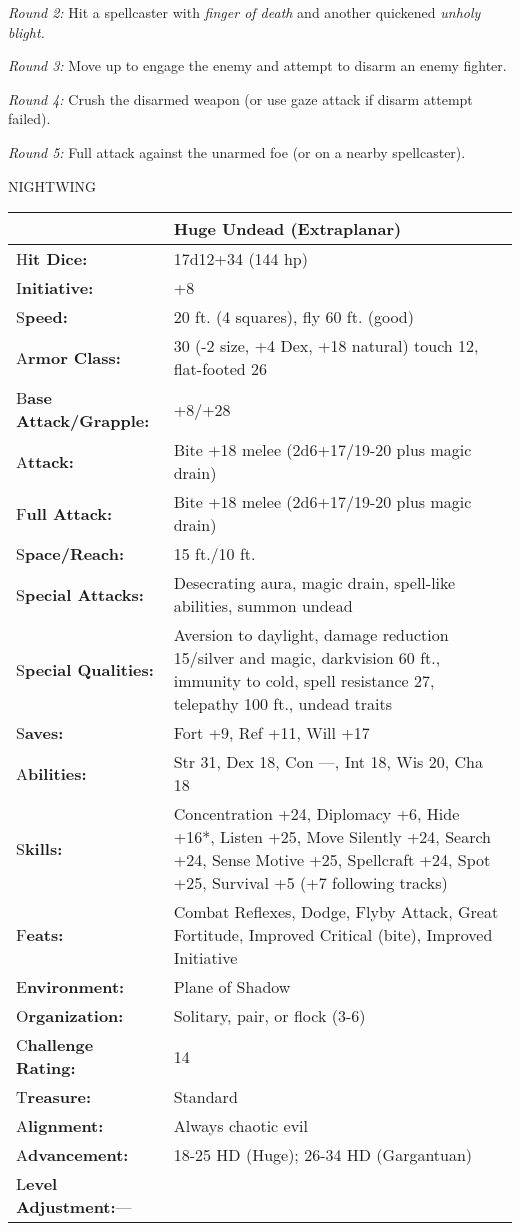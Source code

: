 \documentclass{article}
\begin{document}
\textit{Round 2: }Hit a spellcaster with \textit{finger of death }and another quickened 
\textit{unholy blight.}

\textit{Round 3: }Move up to engage the enemy and attempt to disarm an enemy fighter.

\textit{Round 4: }Crush the disarmed weapon (or use gaze attack if disarm attempt 
failed).

\textit{Round 5: }Full attack against the unarmed foe (or on a nearby spellcaster).

\vspace{12pt}
NIGHTWING

\begin{tabular}{|>{\raggedright}p{90pt}|>{\raggedright}p{236pt}|}
\hline
  & Huge Undead (Extraplanar)\tabularnewline
\hline
H\textbf{it Dice:} & 17d12+34 (144 hp)\tabularnewline
\hline
I\textbf{nitiative:} & +8\tabularnewline
\hline
S\textbf{peed:} & 20 ft. (4 squares), fly 60 ft. (good)\tabularnewline
\hline
A\textbf{rmor Class:} & 30 (-2 size, +4 Dex, +18 natural) touch 12, flat-footed 
26\tabularnewline
\hline
B\textbf{ase Attack/Grapple:} & +8/+28\tabularnewline
\hline
A\textbf{ttack:} & Bite +18 melee (2d6+17/19-20 plus magic drain)\tabularnewline
\hline
F\textbf{ull Attack:} & Bite +18 melee (2d6+17/19-20 plus magic drain)\tabularnewline
\hline
S\textbf{pace/Reach:} & 15 ft./10 ft.\tabularnewline
\hline
S\textbf{pecial Attacks:} & Desecrating aura, magic drain, spell-like abilities, 
summon undead\tabularnewline
\hline
S\textbf{pecial Qualities:} & Aversion to daylight, damage reduction 15/silver 
and magic, darkvision 60 ft., immunity to cold, spell resistance 27, telepathy 
100 ft., undead traits\tabularnewline
\hline
S\textbf{aves:} & Fort +9, Ref +11, Will +17\tabularnewline
\hline
A\textbf{bilities:} & Str 31, Dex 18, Con ---, Int 18, Wis 20, Cha 18\tabularnewline
\hline
S\textbf{kills:} & Concentration +24, Diplomacy +6, Hide +16*, Listen +25, Move 
Silently +24, Search +24, Sense Motive +25, Spellcraft +24, Spot +25, Survival 
+5 (+7 following tracks)\tabularnewline
\hline
F\textbf{eats:} & Combat Reflexes, Dodge, Flyby Attack, Great Fortitude, Improved 
Critical (bite), Improved Initiative\tabularnewline
\hline
E\textbf{nvironment:} & Plane of Shadow\tabularnewline
\hline
O\textbf{rganization:} & Solitary, pair, or flock (3-6)\tabularnewline
\hline
C\textbf{hallenge Rating:} & 14\tabularnewline
\hline
T\textbf{reasure:} & Standard\tabularnewline
\hline
A\textbf{lignment:} & Always chaotic evil\tabularnewline
\hline
A\textbf{dvancement:} & 18-25 HD (Huge); 26-34 HD (Gargantuan)\tabularnewline
\hline
L\textbf{evel Adjustment:}--- & \tabularnewline
\hline
\end{tabular}
\end{document}
